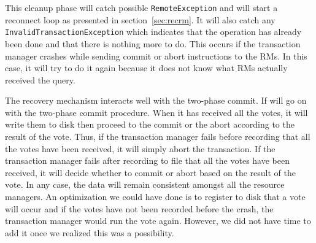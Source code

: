 \documentclass[12pt]{article}
\theoremstyle{plain}%
\theoremstyle{definition}
\theoremstyle{remark}
\newcommand{\java}[1]{{\lstinline!#1!}}
\begin{document}
This cleanup phase will catch possible \java{RemoteException} and will
start a reconnect loop as presented in section~\ref{sec:recrm}. It
will also catch any \java{InvalidTransactionException} which indicates
that the operation has already been done and that there is nothing more
to do. This occurs if the transaction manager crashes while sending
commit or abort instructions to the RMs. In this case, it will try
to do it again because it does not know what RMs actually received
the query. 

The recovery mechanism interacts well with the two-phase commit. If
will go on with the two-phase commit procedure. When it has received
all the votes, it will write them to disk then proceed to the commit
or the abort according to the result of the vote. Thus, if the
transaction manager fails before recording that all the votes have
been received, it will simply abort the transaction. If the
transaction manager fails after recording to file that all
the votes have been received, it will decide whether to commit
or abort based on the result of the vote. In any case, the
data will remain consistent amongst all the resource managers.
An optimization we could have done is to register to disk
that a vote will occur and if the votes have not been recorded
before the crash, the transaction manager would run the vote again.
However, we did not have time to add it once we realized this was
a possibility.
  
\end{document}
